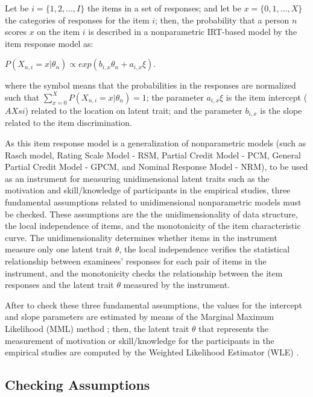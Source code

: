 Let be $i = \{1,2, ..., I\}$ the items in a set of responses; and let be $x = \{0,1, ..., X\}$ the categories of responses for the item $i$; then, the probability that a person $n$ scores $x$ on the item $i$ is described in a nonparametric IRT-based model by the item response model \cite{AdamsWu2007, AdamsWilsonWu1997} as:

$P(X_{n,i} = x | \theta_{n}) \propto exp(b_{i,x} \theta_{n} + a_{i,x} \xi)$.

where the symbol \aspas{$\propto$} means that the probabilities in the responses are normalized such that $\sum_{x=0}^{X} P(X_{n,i} = x | \theta_{n}) = 1$; the parameter $a_{i,x} \xi$ is the item intercept ($AXsi$) related to the location on latent trait; and the parameter $b_{i,x}$ is the slope related to the item discrimination.

As this item response model is a generalization of nonparametric models (such as Rasch model, Rating Scale Model - RSM, Partial Credit Model - PCM, General Partial Credit Model - GPCM, and Nominal Response Model - NRM), to be used as an instrument for measuring unidimensional latent traits such as the motivation and skill/knowledge of participants in the empirical studies, three fundamental assumptions related to unidimensional nonparametric models must be checked. These assumptions are the the unidimensionality of data structure, the local independence of items, and the monotonicity of the item characteristic curve. The unidimensionality determines whether items in the instrument measure only one latent trait $\theta$, the local independence verifies the statistical relationship between examinees’ responses for each pair of items in the instrument, and the monotonicity checks the relationship between the item responses and the latent trait $\theta$ measured by the instrument.

After to check these three fundamental assumptions, the values for the intercept and slope parameters are estimated by means of the Marginal Maximum Likelihood (MML) method \cite{BockAitkin1981}; then, the latent trait $\theta$ that represents the measurement of motivation or skill/knowledge for the participants in the empirical studies are computed by the Weighted Likelihood Estimator (WLE) \cite{Warm1989}. 

\subsection{Checking Assumptions}
\label{sec:checking-assumptions-irt-motivation}

